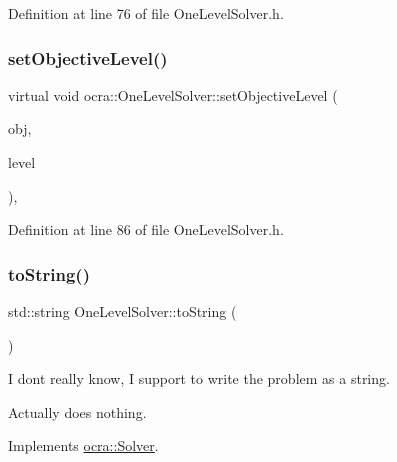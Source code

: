 Definition at line 76 of file One\+Level\+Solver.\+h.

\hypertarget{classocra_1_1OneLevelSolver_ad29abe16f72ae1e1d6ba9017d849ed3f}{}\label{classocra_1_1OneLevelSolver_ad29abe16f72ae1e1d6ba9017d849ed3f} 
\subsubsection{\texorpdfstring{set\+Objective\+Level()}{setObjectiveLevel()}}
{\footnotesize\ttfamily virtual void ocra\+::\+One\+Level\+Solver\+::set\+Objective\+Level (\begin{DoxyParamCaption}\item[{\hyperlink{namespaceocra_a37a91885f4fa5c523d22cb15d5673062}{ocra\+::\+Generic\+Objective} \&}]{obj,  }\item[{int}]{level }\end{DoxyParamCaption})\hspace{0.3cm}{\ttfamily [inline]}, {\ttfamily [virtual]}}



Definition at line 86 of file One\+Level\+Solver.\+h.

\hypertarget{classocra_1_1OneLevelSolver_a4d96beb846ca420bd1efcc96229f9d52}{}\label{classocra_1_1OneLevelSolver_a4d96beb846ca420bd1efcc96229f9d52} 
\subsubsection{\texorpdfstring{to\+String()}{toString()}}
{\footnotesize\ttfamily std\+::string One\+Level\+Solver\+::to\+String (\begin{DoxyParamCaption}{ }\end{DoxyParamCaption})\hspace{0.3cm}{\ttfamily [virtual]}}

I don\textquotesingle{}t really know, I support to write the problem as a string.

Actually does nothing. 

Implements \hyperlink{classocra_1_1Solver_ab3783d1c208500bfb1daa3e1abf34146}{ocra\+::\+Solver}.



